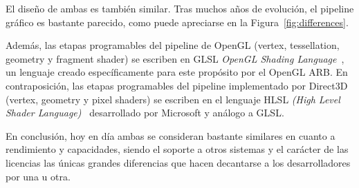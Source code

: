 El diseño de ambas es también similar. Tras muchos años de evolución, el
pipeline gráfico es bastante parecido, como puede apreciarse en la
Figura~\ref{fig:differences}.

Además, las etapas programables del pipeline de OpenGL (vertex, tessellation,
geometry y fragment shader) se escriben en GLSL \textit{OpenGL Shading
Language}~\cite{GLSL}, un lenguaje creado específicamente para este propósito
por el OpenGL ARB. En contraposición, las etapas programables del pipeline
implementado por Direct3D (vertex, geometry y pixel shaders) se escriben en el
lenguaje HLSL \textit{(High Level Shader Language)}~\cite{HLSL} desarrollado por
Microsoft y análogo a GLSL.

En conclusión, hoy en día ambas se consideran bastante similares en cuanto a
rendimiento y capacidades, siendo el soporte a otros sistemas y el carácter de
las licencias las únicas grandes diferencias que hacen decantarse a los
desarrolladores por una u otra.
